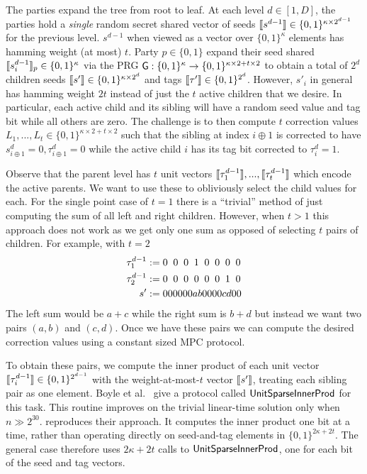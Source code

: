 The parties expand the tree from root to leaf. At each level $d \in [1,D]$, the parties hold a \emph{single} random secret shared vector of seeds $\share{s^{d-1}}\in \{0,1\}^{\kappa\times 2^{d-1}}$ for the previous level. $s^{d-1}$ when viewed as a vector over $\{0,1\}^\kappa$ elements has hamming weight (at most) $t$. Party $p\in \{0,1\}$ expand their seed shared $\share{s^{d-1}_i}_p\in \{0,1\}^{\kappa}$ via the PRG $\mathsf{G} :\{0,1\}^\kappa\rightarrow \{0,1\}^{\kappa \times 2 + t \times 2}$ to obtain a total of $2^{d}$ children seeds $\share{s'}\in \{0,1\}^{\kappa \times 2^{d}}$ and tags $\share{\tau'}\in \{0,1\}^{2^d}$. However, $s'_i$ in general has hamming weight $2t$ instead of just the $t$ active children that we desire. In particular, each active child and its sibling will have a random seed value and tag bit while all others are zero. The challenge is to then compute $t$ correction values $L_{1},...,L_{t}\in \{0,1\}^{\kappa\times 2 + t \times 2}$ such that the sibling at index $i\oplus 1$ is corrected to have $s^{d}_{i\oplus 1}=0, \tau^d_{i\oplus 1} = 0$ while the active child $i$ has its tag bit corrected to $\tau^d_i=1$.

Observe that the parent level has $t$ unit vectors $\share{\tau^{d-1}_1},...,\share{\tau^{d-1}_t}$ which encode the active parents. We want to use these to obliviously select the child values for each. For the single point case of $t=1$ there is a ``trivial'' method of just computing the sum of all left and right children. However, when $t>1$ this approach does not work as we get only one sum as opposed of selecting $t$ pairs of children. For example, with $t=2$
\renewcommand{\sp}{\hspace{5.45px}}
\begin{align*}
    \tau^{d-1}_1 &:= 0\sp 0\sp 0\sp 1\sp 0\sp 0\sp 0\sp 0\\
    \tau^{d-1}_2 &:= 0\sp 0\sp 0\sp 0\sp 0\sp 0\sp 1\sp 0\\
    s' &:= 000000{a}{b}0000{c}{d}00\\
\end{align*}
The left sum would be $a+c$ while the right sum is $b+d$ but instead we want two pairs $(a,b)$ and $(c,d)$. Once we have these pairs we can compute the desired correction values using a constant sized MPC protocol. 

To obtain these pairs, we compute the inner product of each unit vector
$\share{\tau^{d-1}_i}\in \{0,1\}^{2^{d-1}}$ with the weight-at-most-$t$
vector $\share{s'}$, treating each sibling pair as one element.
Boyle et al.~\cite{dmpf} give a protocol called $\mathsf{UnitSparseInnerProd}$ for this task.
This routine improves on the trivial linear-time solution only when
$n \gg 2^{30}$.  reproduces their approach.
It computes the inner product one bit at a time, rather than operating
directly on seed-and-tag elements in $\{0,1\}^{2\kappa+2t}$.
The general case therefore uses $2\kappa+2t$ calls to $\mathsf{UnitSparseInnerProd}$, one
for each bit of the seed and tag vectors.

